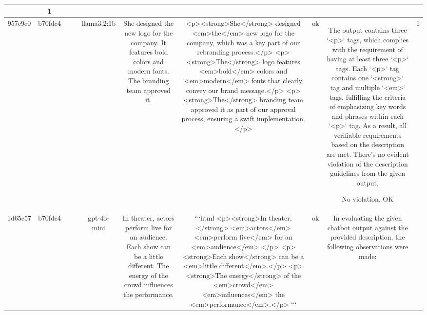 \begin{table}[h!]
\begin{tabular}{|c|c|c|c|c|c|c|c|c|c|}
{{1. **Insufficient <p> tags wrapping entire sentences**: The description requires that each sentence be wrapped with a <p> tag. In the provided output, each keyword or phrase is individually wrapped in separate <p> tags, rather than each complete sentence having its own <p> tag. For example, "She designed the new logo for the company." should be enclosed within one <p> tag, but is split across multiple <p> tags.

2. **Use of <strong> and <em> tags**: While the description requires that each <p> tag should contain one <strong> tag and multiple <em> tags, this rule can only be verified in context with input, so it is not accounted for in the decision.

Due to the incorrect division of sentences across multiple <p> tags, the output does not meet the requirements as per the description. 

ERR & 1\\
\hline
957c9e0 & b70fdc4 &  &  & llama3.2:1b & She designed the new logo for the company. It features bold colors and modern fonts. The branding team approved it. & <p><strong>She</strong> designed <em>the</em> new logo for the company, which was a key part of our rebranding process.</p>
<p><strong>The</strong> logo features <em>bold</em> colors and <em>modern</em> fonts that clearly convey our brand message.</p>
<p><strong>The</strong> branding team approved it as part of our approval process, ensuring a swift implementation.</p> & ok & The output contains three `<p>` tags, which complies with the requirement of having at least three `<p>` tags. Each `<p>` tag contains one `<strong>` tag and multiple `<em>` tags, fulfilling the criteria of emphasizing key words and phrases within each `<p>` tag. As a result, all verifiable requirements based on the description are met. There's no evident violation of the description guidelines from the given output.

No violation.
OK & 1\\
\hline
1d65c57 & b70fdc4 &  &  & gpt-4o-mini & In theater, actors perform live for an audience. Each show can be a little different. The energy of the crowd influences the performance. & ```html
<p><strong>In theater,</strong> <em>actors</em> <em>perform live</em> for an <em>audience</em>.</p>
<p><strong>Each show</strong> can be a <em>little different</em>.</p>
<p><strong>The energy</strong> of the <em>crowd</em> <em>influences</em> the <em>performance</em>.</p>
``` & ok & In evaluating the given chatbot output against the provided description, the following observations were made:

}}
\end{tabular}
\end{table}
